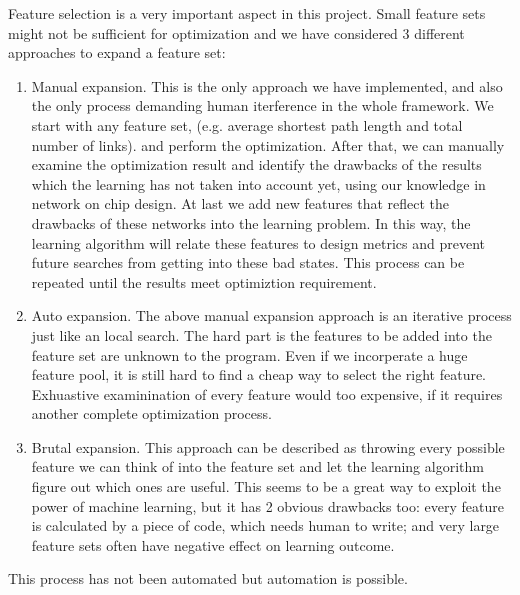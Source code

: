 \documentclass[12pt]{article}
\theoremstyle{definition}
\begin{document}
Feature selection is a very important aspect in this project. Small feature sets might not be sufficient for optimization and we have considered 3 different approaches to expand a feature set:
\begin{enumerate}
  \item Manual expansion. This is the only approach we have implemented, and also the only process demanding human iterference in the whole framework. We start with any feature set, (e.g. average shortest path length and total number of links). and perform the optimization. After that, we can manually examine the optimization result and identify the drawbacks of the results which the learning has not taken into account yet, using our knowledge in network on chip design. At last we add new features that reflect the drawbacks of these networks into the learning problem. In this way, the learning algorithm will relate these features to design metrics and prevent future searches from getting into these bad states. This process can be repeated until the results meet optimiztion requirement.
  \item Auto expansion. The above manual expansion approach is an iterative process just like an local search. The hard part is the features to be added into the feature set are unknown to the program. Even if we incorperate a huge feature pool, it is still hard to find a cheap way to select the right feature. Exhuastive examinination of every feature would too expensive, if it requires another complete optimization process.
  \item Brutal expansion. This approach can be described as throwing every possible feature we can think of into the feature set and let the learning algorithm figure out which ones are useful. This seems to be a great way to exploit the power of machine learning, but it has 2 obvious drawbacks too: every feature is calculated by a piece of code, which needs human to write; and very large feature sets often have negative effect on learning outcome.

\end{enumerate}
This process has not been automated but automation is possible.
\end{document}
